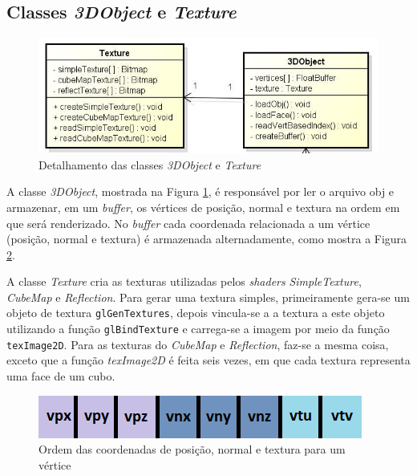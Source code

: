 	\subsection{ Classes \textit{3DObject} e \textit{Texture}}   

	\begin{figure}[h]
	\centering
		\includegraphics[keepaspectratio=true,scale=0.6]{figuras/object_texture.jpg}
	\caption{Detalhamento das classes \textit{3DObject} e \textit{Texture}}
	\label{object_texture}
	\end{figure}

	A classe \textit{3DObject}, mostrada na Figura \ref{object_texture}, é responsável por ler o arquivo obj e armazenar, em um \textit{buffer}, os vértices de posição, normal e textura na ordem em que será renderizado. No \textit{buffer} cada coordenada relacionada a um vértice (posição, normal e textura) é armazenada alternadamente, como mostra a Figura \ref{buffer}.

	A classe \textit{Texture} cria as texturas utilizadas pelos \textit{shaders} \textit{SimpleTexture}, \textit{CubeMap} e \textit{Reflection}. Para gerar uma textura simples, primeiramente gera-se um objeto de textura \texttt{glGenTextures}, depois vincula-se a a textura a este objeto utilizando a função \texttt{glBindTexture} e carrega-se a imagem por meio da função \texttt{texImage2D}.  Para as texturas do \textit{CubeMap} e \textit{Reflection}, faz-se a mesma coisa, exceto que a função \textit{texImage2D} é feita seis vezes, em que cada textura representa uma face de um cubo. 

	\begin{figure}[h]
	\centering
		\includegraphics[keepaspectratio=true,scale=1.0]{figuras/buffer.png}
	\caption{Ordem das coordenadas de posição, normal e textura para um vértice}
	\label{buffer}
	\end{figure}

